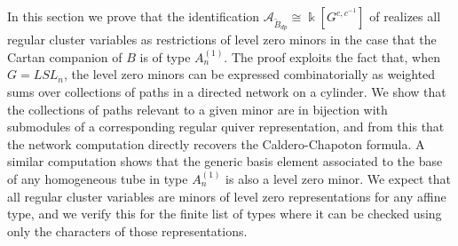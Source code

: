 \documentclass[12pt]{amsart}
\newcommand{\sayHW}[1]{\say[HW]{\color{violet}{\bf HW:}\;#1}}
\newcommand{\cA}{\mathcal{A}}
\newcommand{\kk}{\Bbbk}%
\newcommand{\Bdp}{\widetilde{B}_{dp}}
\newtheorem{proposition}[theorem]{Proposition}
\theoremstyle{remark}
\numberwithin{equation}{section}
\numberwithin{figure}{section}
\begin{document}
In this section we prove that the identification $\cA_{\Bdp} \cong \kk[G^{c,c^{-1}}]$ of  realizes all regular cluster variables as restrictions of level zero minors in the case that the Cartan companion of $B$ is of type $A_n^{\!(1)}$. The proof exploits the fact that, when $G = LSL_n$, the level zero minors can be expressed combinatorially as weighted sums over collections of paths in a directed network on a cylinder. We show that the collections of paths relevant to a given minor are in bijection with submodules of a corresponding regular quiver representation, and from this that the network computation directly recovers the Caldero-Chapoton formula. A similar computation shows that the generic basis element associated to the base of any homogeneous tube in type $A_n^{\!(1)}$ is also a level zero minor. We expect that all regular cluster variables are minors of level zero representations for any affine type, and we verify this for the finite list of types where it can be checked using only the characters of those representations. 

\end{document}
